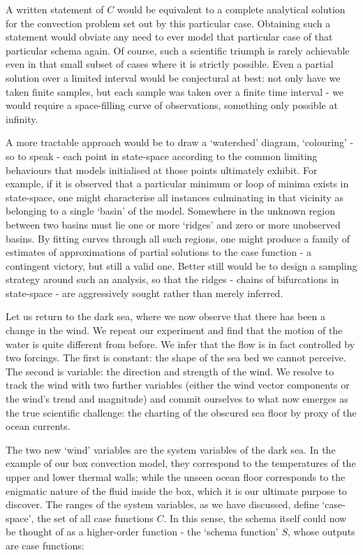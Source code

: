 \documentclass[a4paper,11pt,oneside]{book}
\begin{document}
A written statement of $C$ would be equivalent to a complete analytical solution for the convection problem set out by this particular case. Obtaining such a statement would obviate any need to ever model that particular case of that particular schema again. Of course, such a scientific triumph is rarely achievable even in that small subset of cases where it is strictly possible. Even a partial solution over a limited interval would be conjectural at best: not only have we taken finite samples, but each sample was taken over a finite time interval - we would require a space-filling curve of observations, something only possible at infinity.

A more tractable approach would be to draw a `watershed' diagram, `colouring' - so to speak - each point in state-space according to the common limiting behaviours that models initialised at those points ultimately exhibit. For example, if it is observed that a particular minimum or loop of minima exists in state-space, one might characterise all instances culminating in that vicinity as belonging to a single `basin' of the model. Somewhere in the unknown region between two basins must lie one or more `ridges' and zero or more unobserved basins. By fitting curves through all such regions, one might produce a family of estimates of approximations of partial solutions to the case function - a contingent victory, but still a valid one. Better still would be to design a sampling strategy around such an analysis, so that the ridges - chains of bifurcations in state-space - are aggressively sought rather than merely inferred.

Let us return to the dark sea, where we now observe that there has been a change in the wind. We repeat our experiment and find that the motion of the water is quite different from before. We infer that the flow is in fact controlled by two forcings. The first is constant: the shape of the sea bed we cannot perceive. The second is variable: the direction and strength of the wind. We resolve to track the wind with two further variables (either the wind vector components or the wind's trend and magnitude) and commit ourselves to what now emerges as the true scientific challenge: the charting of the obscured sea floor by proxy of the ocean currents.

The two new `wind' variables are the system variables of the dark sea. In the example of our box convection model, they correspond to the temperatures of the upper and lower thermal walls; while the unseen ocean floor corresponds to the enigmatic nature of the fluid inside the box, which it is our ultimate purpose to discover. The ranges of the system variables, as we have discussed, define `case-space', the set of all case functions $C$. In this sense, the schema itself could now be thought of as a higher-order function - the `schema function' $S$, whose outputs are case functions:
\end{document}
